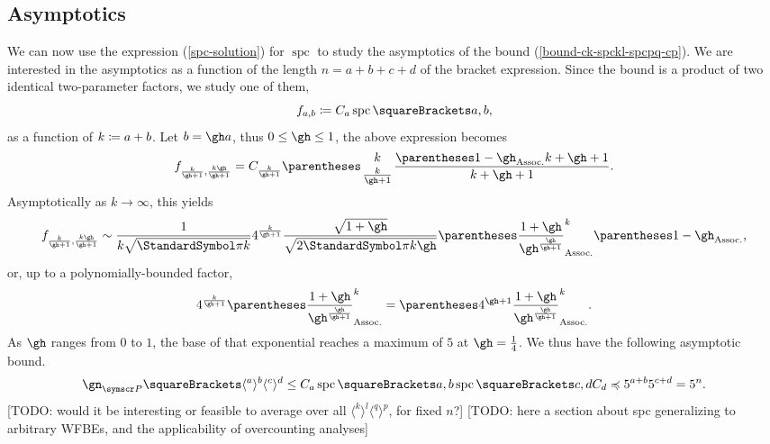 \documentclass[10pt, a4paper, twoside]{basestyle}
\DeclareMathOperator{\spc}{spc}
\newcommand{\pointset}{\symscr}
\begin{document}
\subsection{Asymptotics}
We can now use the expression (\ref{spc-solution}) for $\spc$ to study the asymptotics of the bound
(\ref{bound-ck-spckl-spcpq-cp}).
We are interested in the asymptotics as a function of the length $n = a+b+c+d$ of the bracket expression.
Since the bound is a product of two identical two-parameter factors, we study one of them,\[
f_{a,b}\DefineAs C_a\spc\of{a,b}\text,
\]
as a function of $k\coloneq a+b$. Let $b = \gh a$, thus $0\leq \gh\leq 1$,
the above expression becomes \[
f_{\frac{k}{\gh+1}, \frac{k\gh}{\gh+1}}=
C_{\frac{k}{\gh + 1}} \binom{k}{\frac{k}{\gh + 1}} \frac{\pa{1-\gh}k+\gh+1}{k+\gh+1}\text.
\]
Asymptotically as $k\longrightarrow \infty$, this yields\[
f_{\frac{k}{\gh+1}, \frac{k\gh}{\gh+1}}\sim
\frac
  {1}
  {k\sqrt{\Pi k}}
4^{\frac{k}{\gh + 1}}
\frac
  {\sqrt{1+\gh}}
  {\sqrt{2\Pi k \gh}}
\pa{
  \frac
    {1+\gh}
    {\gh^{\frac{\gh}{\gh + 1}}}}^{k}
\pa{1-\gh}\text,
\]
or, up to a polynomially-bounded factor,\[
4^{\frac{k}{\gh + 1}}
\pa{
  \frac
    {1+\gh}
    {\gh^{\frac{\gh}{\gh + 1}}}}^{k}
=
\pa{
4^{\gh + 1}
\frac
  {1+\gh}
  {\gh^{\frac{\gh}{\gh + 1}}}}^{k}\text.
\]
As $\gh$ ranges from $0$ to $1$, the base of that exponential reaches a maximum of $5$ at
$\gh=\frac 1 4$. We thus have the following asymptotic bound.\begin{equation}
\gn_{\pointset P}\of{\langle^a\rangle^b\langle^c\rangle^d}\leq
C_a\spc\of{a, b}\spc\of{c, d}C_d
\preccurlyeq
5^{a+b}5^{c+d} = 5^n
\text.
\end{equation}
[TODO: would it be interesting or feasible to average over all $\langle^k\rangle^l\langle^q\rangle^p$,
for fixed $n$?]
[TODO: here a section about spc generalizing to arbitrary WFBEs, and the applicability of overcounting
analyses]
\clearpage
\nocite{*}


\end{document}
